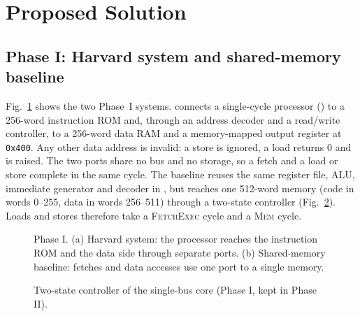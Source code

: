 \section{Proposed Solution}
\subsection{Phase I: Harvard system and shared-memory baseline}
Fig.~\ref{fig:block1} shows the two Phase~I systems.  connects a single-cycle
processor () to a 256-word instruction ROM and, through an address decoder and a
read/write controller, to a 256-word data RAM and a memory-mapped output register at
\texttt{0x400}. Any other data address is invalid: a store is ignored, a load returns 0 and
 is raised. The two ports share no bus and no storage, so a fetch and a load or
store complete in the same cycle. The baseline  reuses the same register file, ALU,
immediate generator and decoder in , but reaches one 512-word memory (code in
words 0--255, data in words 256--511) through a two-state controller (Fig.~\ref{fig:fsm}).
Loads and stores therefore take a \textsc{FetchExec} cycle and a \textsc{Mem} cycle.

\begin{figure}[t]
  \centering
  \resizebox{0.80\textwidth}{!}{}
  \caption{Phase I. (a) Harvard system: the processor reaches the instruction ROM and the data
  side through separate ports. (b) Shared-memory baseline: fetches and data accesses use one
  port to a single memory.}
  \label{fig:block1}
\end{figure}

\begin{figure}[t]
  \centering
  \resizebox{0.62\columnwidth}{!}{}
  \caption{Two-state controller of the single-bus core (Phase I, kept in Phase II).}
  \label{fig:fsm}
\end{figure}

